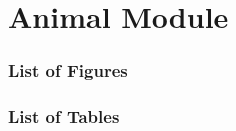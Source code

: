 \part{Animal Module}
\thispagestyle{fancy}

\localtableofcontents
\newpage

\section*{List of Figures}
\locallistoffigures
\newpage

\section*{List of Tables}
\locallistoftables
\newpage


